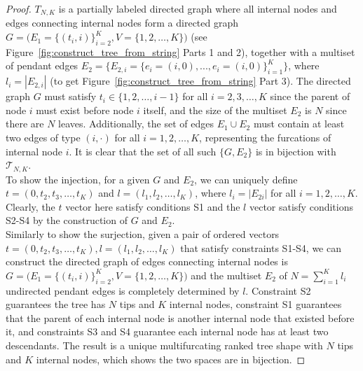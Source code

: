 \documentclass{article}
\begin{document}
\begin{proof}
$T_{N,K}$ is a partially labeled directed graph where all internal nodes and edges connecting internal nodes form a directed graph $ G = \Big ( E_1 =\big \{ (t_i, i) \big \}_{i=2}^K, V= \big \{1,2,\ldots,K\big \} \Big )$ (see Figure~\ref{fig:construct_tree_from_string} Parts 1 and 2), together with a multiset of pendant edges $E_2 = \Big \{E_{2,i}= \big \{ e_i=(i,0),..., e_i=(i,0) \big \}_{i=1}^K \Big \}$, where $l_i = |E_{2,i}|$ (to get  Figure~\ref{fig:construct_tree_from_string} Part 3). The directed graph $G$ must satisfy $t_i \in \{1,2,\ldots,i-1\}$ for all $i=2,3,\ldots,K$ since the parent of node $i$ must exist before node $i$ itself, and the size of the multiset $E_2$ is $N$ since there are $N$ leaves. Additionally, the set of edges $E_1 \cup E_2$ must contain at least two edges of type $(i, \cdot)$ for all $i=1,2,\ldots,K$, representing the furcations of internal node $i$. It is clear that the set of all such $\{G, E_2\}$ is in bijection with $\mathcal{T}_{N,K}$. \\

\noindent To show the injection, for a given $G$ and $E_2$, we can uniquely define $t=(0,t_2,t_3,\ldots,t_K)$ and $l=(l_1,l_2,\ldots,l_K)$, where $l_i= |E_{2i}|$ for all $i=1,2,\ldots,K$. Clearly, the $t$ vector here satisfy conditions S1 and the $l$ vector satisfy conditions S2-S4 by the construction of $G$ and $E_2$. \\ 

\noindent Similarly to show the surjection, given a pair of ordered vectors $t=(0, t_2, t_3, \ldots, t_K), l=(l_1, l_2, \ldots ,l_K)$ that satisfy constraints S1-S4, we can construct the directed graph of edges connecting internal nodes is $ G = \Big ( E_1 = \big \{ (t_i, i) \big \}_{i=2}^K, V= \big \{ 1, 2, \ldots, K\big \} \Big )$ and the multiset $E_2$ of $N=\sum_{i=1}^K l_i$ undirected pendant edges is completely determined by $l$. Constraint S2 guarantees the tree has $N$ tips and $K$ internal nodes, constraint S1 guarantees that the parent of each internal node is another internal node that existed before it, and constraints S3 and S4 guarantee each internal node has at least two descendants. The result is a unique multifurcating ranked tree shape with $N$ tips and $K$ internal nodes, which shows the two spaces are in bijection. 
\end{proof}
\end{document}
